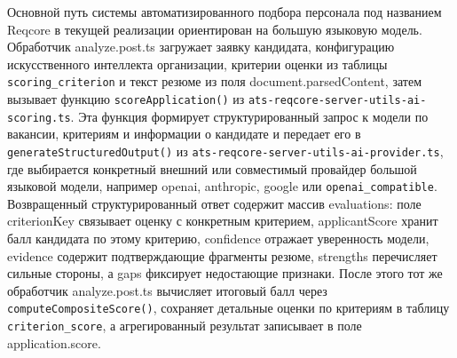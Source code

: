 Основной путь системы автоматизированного подбора персонала под названием Reqcore в текущей реализации ориентирован на большую языковую модель. Обработчик analyze.post.ts загружает заявку кандидата, конфигурацию искусственного интеллекта организации, критерии оценки из таблицы \texttt{scoring\_criterion} и текст резюме из поля document.parsedContent, затем вызывает функцию \texttt{scoreApplication()} из \texttt{ats-reqcore-server-utils-ai-scoring.ts}. Эта функция формирует структурированный запрос к модели по вакансии, критериям и информации о кандидате и передает его в \texttt{generateStructuredOutput()} из \texttt{ats-reqcore-server-utils-ai-provider.ts}, где выбирается конкретный внешний или совместимый провайдер большой языковой модели, например openai, anthropic, google или \texttt{openai\_compatible}. Возвращенный структурированный ответ содержит массив evaluations: поле criterionKey связывает оценку с конкретным критерием, applicantScore хранит балл кандидата по этому критерию, confidence отражает уверенность модели, evidence содержит подтверждающие фрагменты резюме, strengths перечисляет сильные стороны, а gaps фиксирует недостающие признаки. После этого тот же обработчик analyze.post.ts вычисляет итоговый балл через \texttt{computeCompositeScore()}, сохраняет детальные оценки по критериям в таблицу \texttt{criterion\_score}, а агрегированный результат записывает в поле application.score.

